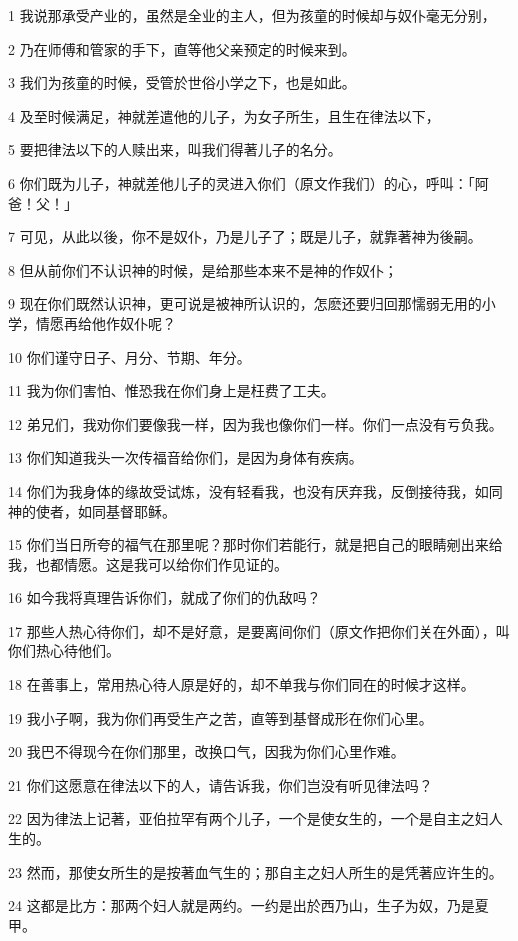 \par 1 我说那承受产业的，虽然是全业的主人，但为孩童的时候却与奴仆毫无分别，
\par 2 乃在师傅和管家的手下，直等他父亲预定的时候来到。
\par 3 我们为孩童的时候，受管於世俗小学之下，也是如此。
\par 4 及至时候满足，神就差遣他的儿子，为女子所生，且生在律法以下，
\par 5 要把律法以下的人赎出来，叫我们得著儿子的名分。
\par 6 你们既为儿子，神就差他儿子的灵进入你们（原文作我们）的心，呼叫：「阿爸！父！」
\par 7 可见，从此以後，你不是奴仆，乃是儿子了；既是儿子，就靠著神为後嗣。
\par 8 但从前你们不认识神的时候，是给那些本来不是神的作奴仆；
\par 9 现在你们既然认识神，更可说是被神所认识的，怎麽还要归回那懦弱无用的小学，情愿再给他作奴仆呢？
\par 10 你们谨守日子、月分、节期、年分。
\par 11 我为你们害怕、惟恐我在你们身上是枉费了工夫。
\par 12 弟兄们，我劝你们要像我一样，因为我也像你们一样。你们一点没有亏负我。
\par 13 你们知道我头一次传福音给你们，是因为身体有疾病。
\par 14 你们为我身体的缘故受试炼，没有轻看我，也没有厌弃我，反倒接待我，如同神的使者，如同基督耶稣。
\par 15 你们当日所夸的福气在那里呢？那时你们若能行，就是把自己的眼睛剜出来给我，也都情愿。这是我可以给你们作见证的。
\par 16 如今我将真理告诉你们，就成了你们的仇敌吗？
\par 17 那些人热心待你们，却不是好意，是要离间你们（原文作把你们关在外面），叫你们热心待他们。
\par 18 在善事上，常用热心待人原是好的，却不单我与你们同在的时候才这样。
\par 19 我小子啊，我为你们再受生产之苦，直等到基督成形在你们心里。
\par 20 我巴不得现今在你们那里，改换口气，因我为你们心里作难。
\par 21 你们这愿意在律法以下的人，请告诉我，你们岂没有听见律法吗？
\par 22 因为律法上记著，亚伯拉罕有两个儿子，一个是使女生的，一个是自主之妇人生的。
\par 23 然而，那使女所生的是按著血气生的；那自主之妇人所生的是凭著应许生的。
\par 24 这都是比方：那两个妇人就是两约。一约是出於西乃山，生子为奴，乃是夏甲。
